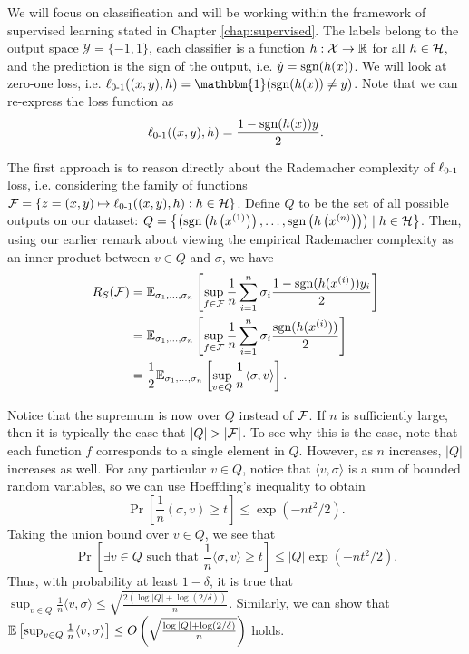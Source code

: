 We will focus on classification and will be working within the framework of supervised learning stated in Chapter \ref{chap:supervised}. The labels belong to the output space $\mathcal{Y} = \{-1, 1\}$, each classifier is a function $h:\mathcal{X}\to\mathbb R$ for all $h \in \mathcal H$, and the prediction is the sign of the output, i.e. $\hat{y} = \text{sgn}(h(x))$. We will look at zero-one loss, i.e. $\err((x,y), h) = \mathbbm{1}(\sgn(h(x))\neq y)$. Note that we can re-express the loss function as
\begin{equation}
\ell_{\textup{0-1}}((x,y), h) = \frac{1-\text{sgn}(h(x))y}{2}.
\end{equation}

The first approach is to reason directly about the Rademacher complexity of $\ell_{\textup{0-1}}$ loss, i.e. considering the family of functions $\mathcal F = \left\{ z = (x, y) \mapsto \ell_{\textup{0-1}}((x, y), h) : h \in \mathcal H \right\}$. Define $Q$ to be the set of all possible outputs on our dataset: $Q=\left\{\left(\text{sgn}\left(h\left(x^{(1)}\right)\right), \dots, \text{sgn} \left(h\left(x^{(n)}\right)\right)\right)\mid  h \in \mathcal H \right\}$. Then, using our earlier remark about viewing the empirical Rademacher complexity as an inner product between $v\in Q$ and $\sigma$, we have
\begin{align}
R_S(\mathcal F) &= \mathbb{E}_{\sigma_1,\dots, \sigma_n} \left[ \sup_{f\in \mathcal F} \frac{1}{n} \sum^n_{i=1} \sigma_i \frac{1-\text{sgn}(h(x^{(i)}))y_i}{2} \right] \\
&= \mathbb{E}_{\sigma_1,\dots, \sigma_n} \left[ \sup_{f\in \mathcal F} \frac{1}{n} \sum^n_{i=1} \sigma_i \frac{\text{sgn}(h(x^{(i)}))}{2} \right] \\
&= \frac{1}{2}\mathbb{E}_{\sigma_1,\dots, \sigma_n} \left[ \sup_{v\in Q} \frac{1}{n} \langle \sigma, v\rangle \right].
\end{align}

Notice that the supremum is now over $Q$ instead of $\mathcal F$. If $n$ is sufficiently large, then it is typically the case that $|Q|>|\cF|$. To see why this is the case, note that each function $f$ corresponds to a single element in $Q$. However, as $n$ increases, $|Q|$ increases as well. For any particular $v\in Q$, notice that $\langle v, \sigma\rangle$ is a sum of bounded random variables, so we can use Hoeffding's inequality to obtain
\begin{equation}
\Pr\left[\frac{1}{n}(\sigma, v) \geq t\right] \leq \exp (-n t^2 / 2).
\end{equation}
Taking the union bound over $v\in Q$, we see that 
\begin{equation}
\Pr\left[\exists v\in Q \text{ such that } \frac{1}{n}\langle\sigma, v\rangle \geq t\right] \leq |Q| \exp (-nt^2 / 2).
\end{equation}
Thus, with probability at least $1-\delta$, it is true that $\sup _{v \in Q} \frac{1}{n}\langle v, \sigma \rangle \leq \sqrt{\frac{2(\log|Q| + \log (2/\delta))}{n}}$. Similarly, we can show that $\mathbb{E} \left[ \sup _{v \in Q} \frac{1}{n}\langle v, \sigma \rangle \right] \leq O\left(\sqrt{\frac{\log|Q| + \log (2/\delta)}{n}}\right)$ holds.


